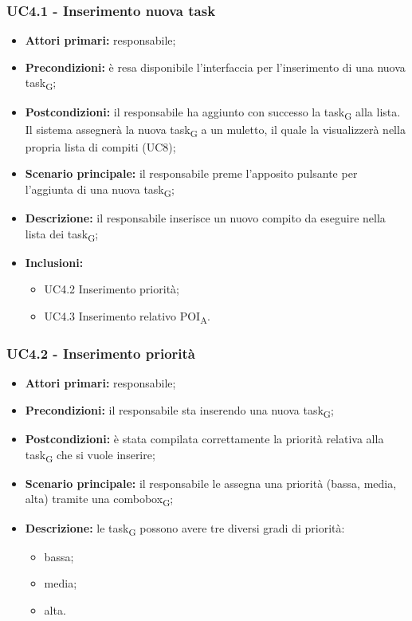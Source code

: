 \subsubsection{UC4.1 - Inserimento nuova task}

\begin{itemize}
	\item 	\textbf{Attori primari:} responsabile;
	\item 	\textbf{Precondizioni:} è resa disponibile l'interfaccia per l'inserimento di una nuova task\textsubscript{G};
	\item 	\textbf{Postcondizioni:} il responsabile ha aggiunto con successo la task\textsubscript{G} alla lista. Il sistema assegnerà la nuova task\textsubscript{G} a un muletto, il quale la visualizzerà nella propria lista di compiti (UC8);
	\item 	\textbf{Scenario principale:} il responsabile preme l'apposito pulsante per l'aggiunta di una nuova task\textsubscript{G}; 
	\item 	\textbf{Descrizione:} il responsabile inserisce un nuovo compito da eseguire nella lista dei task\textsubscript{G};
	\item 	\textbf{Inclusioni:}
	\begin{itemize}
		\item UC4.2 Inserimento priorità;
		\item UC4.3 Inserimento relativo POI\textsubscript{A}.
	\end{itemize}
\end{itemize}

\subsubsection{UC4.2 - Inserimento priorità}

\begin{itemize}
	\item 	\textbf{Attori primari:} responsabile;
	\item 	\textbf{Precondizioni:} il responsabile sta inserendo una nuova task\textsubscript{G};
	\item 	\textbf{Postcondizioni:} è stata compilata correttamente la priorità relativa alla task\textsubscript{G} che si vuole inserire;
	\item 	\textbf{Scenario principale:} il responsabile le assegna una priorità (bassa, media, alta) tramite una combobox\textsubscript{G};
	\item 	\textbf{Descrizione:} le task\textsubscript{G} possono avere tre diversi gradi di priorità:
	\begin{itemize}
		\item bassa;
		\item media;
		\item alta.
	\end{itemize}
\end{itemize}

